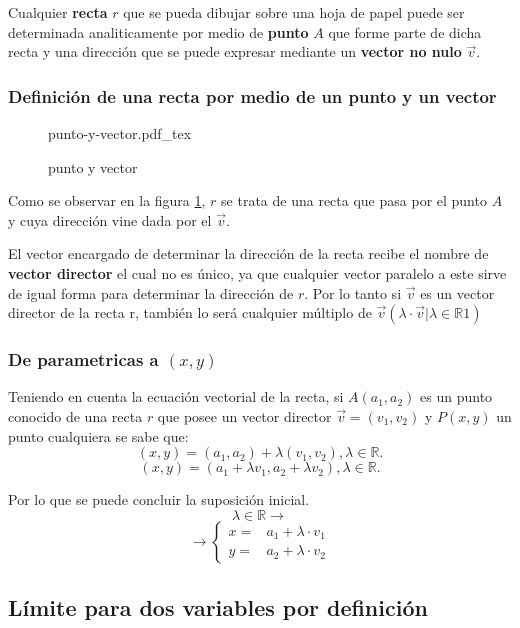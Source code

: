 \documentclass[a4paper]{book}
\newcommand{\incfig}[2][1]{%
    \def\svgwidth{#1\columnwidth}
    {#2.pdf_tex}
}
\begin{document}
Cualquier \textbf{recta} \(r\) que se pueda dibujar sobre una hoja de papel puede ser determinada analiticamente por medio de \textbf{punto} \(A\) que forme parte de dicha recta y una dirección que se puede expresar mediante un \textbf{vector no nulo} \(\overrightarrow{v}\).

\subsubsection{Definición de una recta por medio de un punto y un vector}

\begin{figure}[ht]
    \centering
    \incfig[0.7]{punto-y-vector}
    \caption{punto y vector}
    \label{fig:punto-y-vector}
\end{figure}

Como se observar en la figura \ref{fig:punto-y-vector}, \(r\) se trata de una recta que pasa por el punto \(A\) y cuya dirección vine dada por el \(\overrightarrow{v}\).

El vector encargado de determinar la dirección de la recta recibe el nombre de
\textbf{vector director} el cual no es único, ya que cualquier vector paralelo
a este sirve de igual forma para determinar la dirección de \(r\). Por lo tanto
si \(\overrightarrow{v}\) es un vector director de la recta r, también lo será
cualquier múltiplo de \(\overrightarrow{v}\left(\lambda \cdot
\overrightarrow{v}|\lambda \in\mathbb{R}1\right) \)

\subsubsection{De parametricas a \(\left(x,y\right)\)}

Teniendo en cuenta la ecuación vectorial de la recta, si \(A\left(a_1,a_2\right)\) es un punto conocido de una recta \(r\) que posee un vector director \(\overrightarrow{v}=\left( v_1,v_2 \right)\) y \(P\left(x,y\right)\) un punto cualquiera se sabe que:
\[
\left(x,y\right) =\left(a_1,a_2\right) + \lambda \left( v_1,v_2\right), \lambda \in\mathbb{R}
.\]
\[
\left(x,y\right) =\left(a_1+ \lambda v_1,a_2 + \lambda v_2\right), \lambda \in\mathbb{R}
.\]

Por lo que se puede concluir la suposición inicial.
\[
\lambda \in \mathbb{R} \to
\]
\[
\to\left\{
    \begin{array}{ll}
        x=&a_1+\lambda \cdot v_1 \\
        y=&a_2+\lambda \cdot v_2
    \end{array}
\right
.\]




\subsection{Límite para dos variables por definición}
\label{ssec:limite_para_dos_variables_por_definicion}
\end{document}
